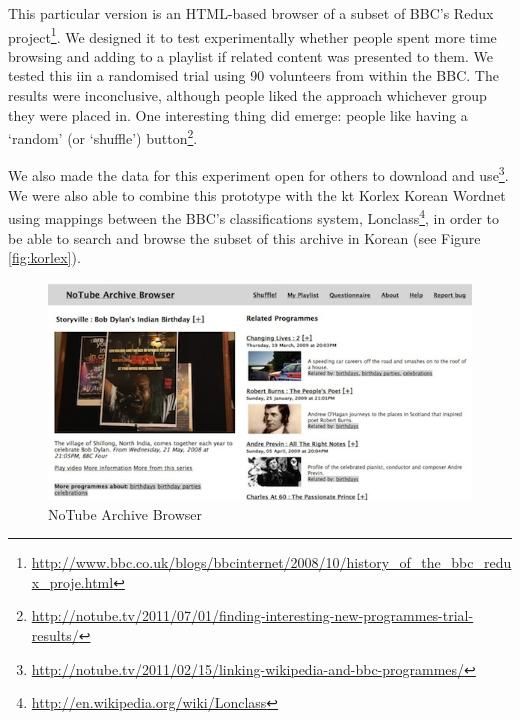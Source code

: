 \documentclass{notube}
\begin{document}
This particular version is an HTML-based browser of a subset of BBC's Redux project\footnote{\url{http://www.bbc.co.uk/blogs/bbcinternet/2008/10/history_of_the_bbc_redux_proje.html}}. We designed it to test experimentally whether people spent more time browsing and adding to a playlist if related content was presented to them.  We tested this iin a randomised trial using 90 volunteers from within the BBC. The results were inconclusive, although people liked the approach whichever group they were placed in. One interesting thing did emerge: people like having a `random' (or `shuffle') button\footnote{\url{http://notube.tv/2011/07/01/finding-interesting-new-programmes-trial-results/}}. 

We also made the data for this experiment open for others to download and use\footnote{\url{http://notube.tv/2011/02/15/linking-wikipedia-and-bbc-programmes/}}. We were also able to combine this prototype with the kt Korlex Korean Wordnet using mappings between the BBC's classifications system, Lonclass\footnote{\url{http://en.wikipedia.org/wiki/Lonclass}}, in order to be able to search and browse the subset of this archive in Korean (see Figure \ref{fig:korlex}).

\begin{figure}[htbp]
\begin{center}
\includegraphics[width=6in]{images/notube-archive-browser.jpg}
\caption{NoTube Archive Browser} \label{fig:archive}
\end{center}
\end{figure} 
\end{document}

